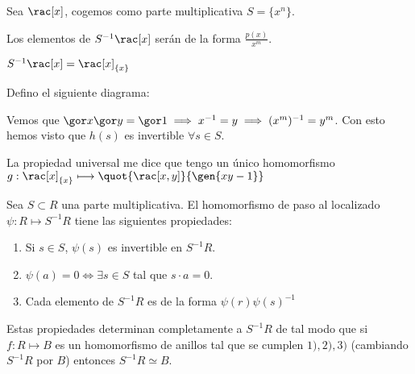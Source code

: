 	\begin{example}
		Sea $\rac[x]$, cogemos como parte multiplicativa $S=\{x^n\}$.

		Los elementos de $S^{-1}\rac[x]$ serán de la forma $\frac{p(x)}{x^m}$.

		\notacion $S^{-1}\rac[x]=\rac[x]_{\{x\}}$

		Defino el siguiente diagrama:

		\begin{center}
		\end{center}

		Vemos que $\cls{x}\cls{y}=\cls{1} \implies x^{-1}=y \implies (x^m)^{-1}=y^m$. Con esto hemos visto que $h(s)$ es invertible $\forall s \in S$.

		La propiedad universal me dice que tengo un único homomorfismo $g: \rac[x]_{\{x\}}\longmapsto \quot{\rac[x,y]}{\gen{xy-1}}$

	\end{example}

	\begin{theorem} \label{thm:PropsLocalizacion}
		Sea $S \subset R$ una parte multiplicativa. El homomorfismo de paso al localizado $\psi:R \longmapsto S^{-1}R$ tiene las siguientes propiedades:
		\begin{enumerate}
			\item Si $s\in S$, $\psi(s)$ es invertible en $S^{-1}R$.
			\item $\psi(a)=0 \Leftrightarrow \exists s \in S$ tal que $s\cdot a=0$.
			\item Cada elemento de $S^{-1}R$ es de la forma $\psi(r)\psi(s)^{-1}$
		\end{enumerate}

		Estas propiedades determinan completamente a $S^{-1}R$ de tal modo que si $f:R \longmapsto B$ es un homomorfismo de anillos tal que se cumplen $1), 2), 3)$ (cambiando $S^{-1}R$ por $B$) entonces $S^{-1}R \simeq B$.
	\end{theorem}

